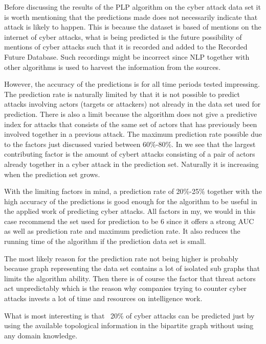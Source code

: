 
Before discussing the results of the PLP algorithm on the cyber attack data set it is worth mentioning that the predictions made does not necessarily indicate that attack is likely to happen. This is because the dataset is based of mentions on the internet of cyber attacks, what is being predicted is the future possibility of mentions of cyber attacks such that it is recorded and added to the Recorded Future Database. Such recordings might be incorrect since NLP together with other algorithms is used to harvest the information from the sources.

However, the accuracy of the predictions is for all time periods tested impressing. The prediction rate is naturally limited by that it is not possible to predict attacks involving actors (targets or attackers) not already in the data set used for prediction. There is also a limit because the algorithm does not give a predictive index for attacks that consists of the same set of actors that has previously been involved together in a previous attack. The maximum prediction rate possible due to the factors just discussed varied between 60\%-80\%. In  we see that the largest contributing factor is the amount of cybert attacks consisting of a pair of actors already together in a cyber attack in the prediction set. Naturally it is increasing when the prediction set grows.

With the limiting factors in mind, a prediction rate of 20\%-25\% together with the high accuracy of the predictions is good enough for the algorithm to be useful in the applied work of predicting cyber attacks. All factors in my, we would in this case recommend the set used for prediction to be 6 since it offers a strong AUC as well as prediction rate and maximum prediction rate. It also reduces the running time of the algorithm if the prediction data set is small.

The most likely reason for the prediction rate not being higher is probably because graph representing the data set contains a lot of isolated sub graphs that limits the algorithm ability. Then there is of course the factor that threat actors act unpredictably which is the reason why companies trying to counter cyber attacks invests a lot of time and resources on intelligence work.

What is most interesting is that ~20\% of cyber attacks can be predicted just by using the available topological information in the bipartite graph without using any domain knowledge.

